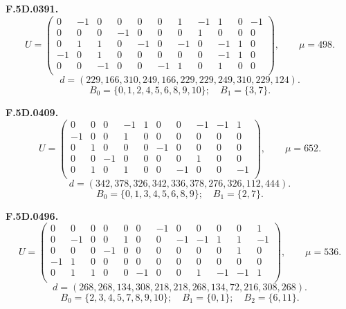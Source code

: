 \par\medskip\noindent\begin{minipage}{\linewidth}\textbf{F.5D.0391.}
\begingroup\small\setlength{\arraycolsep}{3pt}
\[U=\begin{pmatrix}
0 & -1 & 0 & 0 & 0 & 0 & 1 & -1 & 1 & 0 & -1\\
0 & 0 & 0 & -1 & 0 & 0 & 0 & 1 & 0 & 0 & 0\\
0 & 1 & 1 & 0 & -1 & 0 & -1 & 0 & -1 & 1 & 0\\
-1 & 0 & 1 & 0 & 0 & 0 & 0 & 0 & -1 & 1 & 0\\
0 & 0 & -1 & 0 & 0 & -1 & 1 & 0 & 1 & 0 & 0\\
\end{pmatrix},\qquad \mu=498.\]
\[d=(229,166,310,249,166,229,229,249,310,229,124).\]
\[B_0=\{0,1,2,4,5,6,8,9,10\};\quad B_1=\{3,7\}.\]
\endgroup\end{minipage}\par
\par\medskip\noindent\begin{minipage}{\linewidth}\textbf{F.5D.0409.}
\begingroup\small\setlength{\arraycolsep}{3pt}
\[U=\begin{pmatrix}
0 & 0 & 0 & -1 & 1 & 0 & 0 & -1 & -1 & 1\\
-1 & 0 & 0 & 1 & 0 & 0 & 0 & 0 & 0 & 0\\
0 & 1 & 0 & 0 & 0 & -1 & 0 & 0 & 0 & 0\\
0 & 0 & -1 & 0 & 0 & 0 & 0 & 1 & 0 & 0\\
0 & 1 & 0 & 1 & 0 & 0 & -1 & 0 & 0 & -1\\
\end{pmatrix},\qquad \mu=652.\]
\[d=(342,378,326,342,336,378,276,326,112,444).\]
\[B_0=\{0,1,3,4,5,6,8,9\};\quad B_1=\{2,7\}.\]
\endgroup\end{minipage}\par
\par\medskip\noindent\begin{minipage}{\linewidth}\textbf{F.5D.0496.}
\begingroup\small\setlength{\arraycolsep}{3pt}
\[U=\begin{pmatrix}
0 & 0 & 0 & 0 & 0 & 0 & -1 & 0 & 0 & 0 & 0 & 1\\
0 & -1 & 0 & 0 & 1 & 0 & 0 & -1 & -1 & 1 & 1 & -1\\
0 & 0 & 0 & -1 & 0 & 0 & 0 & 0 & 0 & 0 & 1 & 0\\
-1 & 1 & 0 & 0 & 0 & 0 & 0 & 0 & 0 & 0 & 0 & 0\\
0 & 1 & 1 & 0 & 0 & -1 & 0 & 0 & 1 & -1 & -1 & 1\\
\end{pmatrix},\qquad \mu=536.\]
\[d=(268,268,134,308,218,218,268,134,72,216,308,268).\]
\[B_0=\{2,3,4,5,7,8,9,10\};\quad B_1=\{0,1\};\quad B_2=\{6,11\}.\]
\endgroup\end{minipage}\par
